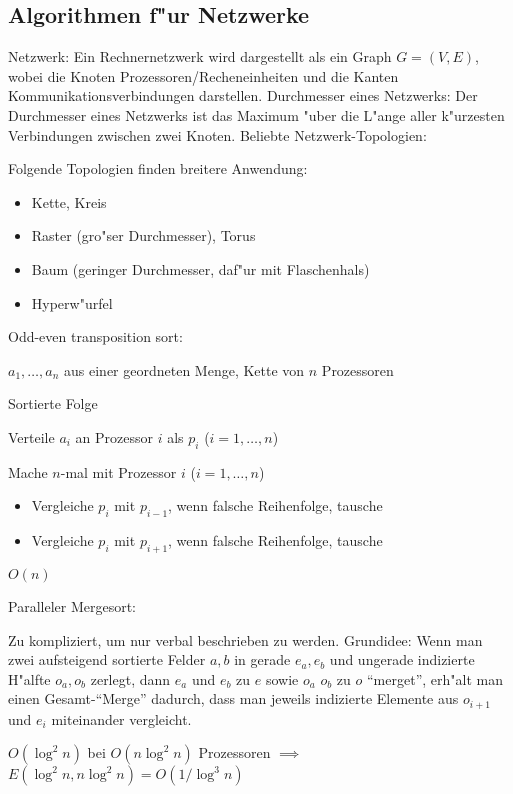 \subsection{Algorithmen f"ur Netzwerke}
 Netzwerk:{
  Ein Rechnernetzwerk wird dargestellt als ein Graph $G=(V,E)$, wobei
  die Knoten Prozessoren/Recheneinheiten und die Kanten 
  Kommunikationsverbindungen darstellen.
}
 Durchmesser eines Netzwerks:{
  Der Durchmesser eines Netzwerks ist das Maximum "uber die L"ange aller
  k"urzesten Verbindungen zwischen zwei Knoten.
}
\remark Beliebte Netzwerk-Topologien:{
  Folgende Topologien finden breitere Anwendung:
  \begin{itemize}
    \item Kette, Kreis
    \item Raster (gro"ser Durchmesser), Torus
    \item Baum (geringer Durchmesser, daf"ur mit Flaschenhals)
    \item Hyperw"urfel
  \end{itemize}
}
\algorithm Odd-even transposition sort:{
  \given $a_1,\ldots,a_n$ aus einer geordneten Menge, Kette von $n$ Prozessoren
  
  \aim Sortierte Folge
  
  \begin{proc}
    \item Verteile $a_i$ an Prozessor $i$ als $p_i$ ($i=1,\ldots,n$)
    \item Mache $n$-mal mit Prozessor $i$ ($i=1,\ldots,n$)
      \begin{itemize}
        \item Vergleiche $p_i$ mit $p_{i-1}$, wenn falsche Reihenfolge, tausche
        \item Vergleiche $p_i$ mit $p_{i+1}$, wenn falsche Reihenfolge, tausche
      \end{itemize}
  \end{proc}
  
  \cpx $O(n)$ 
}
\algorithm Paralleler Mergesort:{
  Zu kompliziert, um nur verbal beschrieben zu werden. Grundidee:
  Wenn man zwei aufsteigend sortierte Felder $a,b$ in gerade $e_a,e_b$
  und ungerade indizierte H"alfte $o_a,o_b$ zerlegt, dann $e_a$ und $e_b$ 
  zu $e$ sowie $o_a$ $o_b$ zu $o$ ``merget'', erh"alt man einen 
  Gesamt-``Merge'' dadurch, dass man jeweils indizierte Elemente aus 
  $o_{i+1}$ und $e_i$ miteinander vergleicht.
  
  \cpx $O(\log^2 n)$ bei $O(n \log^2 n)$ Prozessoren $\implies$ 
    $E(\log^2 n,n\log^2 n)=O(1/\log^3 n)$
}
